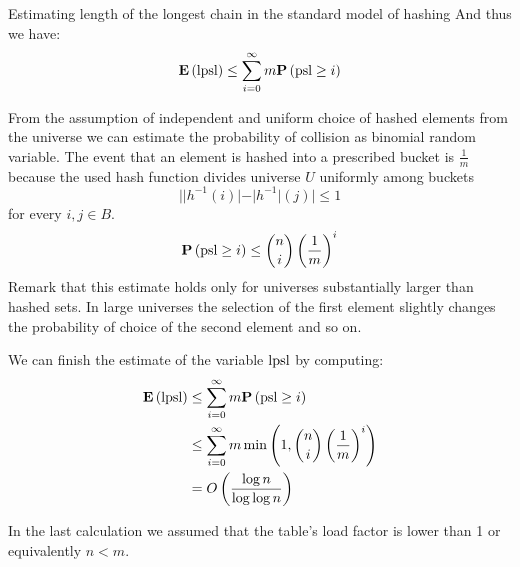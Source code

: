 \begin{section}{Estimating length of the longest chain in the standard model of hashing}
And thus we have:
\begin{displaymath}
\mathbf{E}\left(\mathrm{lpsl}\right) \leq \displaystyle \sum_{i = 0}^{\infty} m \mathbf{P}\left(\mathrm{psl} \geq i\right)
\end{displaymath}

From the assumption of independent and uniform choice of hashed elements from the universe we can estimate the probability of collision as binomial random variable. The event that an element is hashed into a prescribed bucket is $\frac{1}{m}$ because the used hash function divides universe $U$ uniformly among buckets \[ ||h^{-1}(i)| - |h^{-1}|(j)| \leq 1 \] for every $i, j \in B$.
\begin{displaymath}
\mathbf{P}\left(\mathrm{psl} \geq i\right) \leq \dbinom{n}{i}\left(\frac{1}{m}\right)^i
\end{displaymath}
Remark that this estimate holds only for universes substantially larger than hashed sets. In large universes the selection of the first element slightly changes the probability of choice of the second element and so on.

We can finish the estimate of the variable $\mathrm{lpsl}$ by computing:
\begin{displaymath}
\begin{split}
\mathbf{E}\left(\mathrm{lpsl}\right)	& \leq \displaystyle \sum_{i = 0}^{\infty} m \mathbf{P}\left(\mathrm{psl} \geq i\right) \\
		& \leq \displaystyle \sum_{i = 0}^{\infty} m \min\left(1, \dbinom{n}{i}\left(\frac{1}{m}\right)^i\right) \\
		& = O\left(\frac{\log n}{\log \log n}\right)
\end{split}
\end{displaymath}

In the last calculation we assumed that the table's load factor is lower than 1 or equivalently $n < m$.
\end{section}

